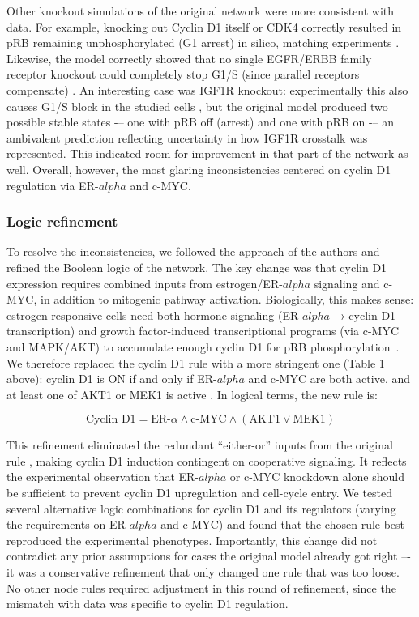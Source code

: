 \documentclass[a4paper,12pt]{article}
\begin{document}
Other knockout simulations of the original network were more consistent with data. For example, knocking out Cyclin D1 itself or CDK4 correctly resulted in pRB remaining unphosphorylated (G1 arrest) in silico, matching experiments . Likewise, the model correctly showed that no single EGFR/ERBB family receptor knockout could completely stop G1/S (since parallel receptors compensate) . An interesting case was IGF1R knockout: experimentally this also causes G1/S block in the studied cells , but the original model produced two possible stable states -– one with pRB off (arrest) and one with pRB on -– an ambivalent prediction reflecting uncertainty in how IGF1R crosstalk was represented. This indicated room for improvement in that part of the network as well. Overall, however, the most glaring inconsistencies centered on cyclin D1 regulation via ER-$alpha$ and c-MYC.

\subsubsection{Logic refinement}

To resolve the inconsistencies, we followed the approach of the authors and refined the Boolean logic of the network. The key change was that cyclin D1 expression requires combined inputs from estrogen/ER-$alpha$ signaling and c-MYC, in addition to mitogenic pathway activation. Biologically, this makes sense: estrogen-responsive cells need both hormone signaling (ER-$alpha$ → cyclin D1 transcription) and growth factor-induced transcriptional programs (via c-MYC and MAPK/AKT) to accumulate enough cyclin D1 for pRB phosphorylation~\cite{Louie2017}. We therefore replaced the cyclin D1 rule with a more stringent one (Table 1 above): cyclin D1 is ON if and only if ER-$alpha$ and c-MYC are both active, and at least one of AKT1 or MEK1 is active . In logical terms, the new rule is:

\begin{equation}
\text{Cyclin D1} = \text{ER-$\alpha$} \wedge \text{c-MYC} \wedge (\text{AKT1} \vee \text{MEK1})
\end{equation}

This refinement eliminated the redundant “either-or” inputs from the original rule , making cyclin D1 induction contingent on cooperative signaling. It reflects the experimental observation that ER-$alpha$ or c-MYC knockdown alone should be sufficient to prevent cyclin D1 upregulation and cell-cycle entry. 
We tested several alternative logic combinations for cyclin D1 and its regulators (varying the requirements on ER-$alpha$ and c-MYC) and found that the chosen rule best reproduced the experimental phenotypes. Importantly, this change did not contradict any prior assumptions for cases the original model already got right –- it was a conservative refinement that only changed one rule that was too loose. No other node rules required adjustment in this round of refinement, since the mismatch with data was specific to cyclin D1 regulation.
\end{document}

